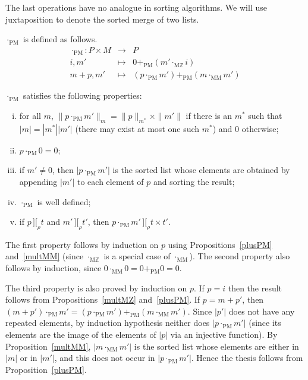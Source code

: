\documentclass[numreferences]{kluwer}
\newcommand{\intII}{\,]\![}
\newcommand{\intrel}{\mathbin{\intII_{\rho}}}
\newcommand{\Z}{{\mathbb Z}}
\newcommand{\coeff}[2]{\ensuremath{\|#2\|_{#1}}}
\newcommand{\multMZ}{\ensuremath{\cdot_{\mathrm M\Z}}}
\newcommand{\multMM}{\ensuremath{\cdot_{\mathrm{MM}}}}
\newcommand{\plusPM}{\ensuremath{+_{\mathrm{PM}}}}
\newcommand{\multPM}{\ensuremath{\cdot_{\mathrm{PM}}}}
\begin{document}
\begin{article}
The last operations have no analogue in sorting algorithms.
We will use juxtaposition to denote the sorted merge of two lists.

\begin{definition}\label{defn:multPM} {\multPM} is defined as follows.
\begin{eqnarray*}
\multPM : P\times M & \to & P \\
 i, m' & \mapsto & 0\plusPM (m'\multMZ i) \\
 m+p, m' & \mapsto & (p\multPM m')\plusPM (m\multMM m')
\end{eqnarray*}
\end{definition}

\begin{proposition}\label{multPM}
{\multPM} satisfies the following properties:
\begin{enumerate}[(i)]
\item for all $m$, $\coeff m{p\multPM m'}=\coeff{m^\ast}p\times\|m'\|$ if
there is
an $m^\ast$ such that $|m|=|m^\ast||m'|$ (there may exist at most one such $m^\ast$) and $0$ otherwise;
\item $p\multPM 0=0$;
\item if $m'\neq 0$, then $|p\multPM m'|$ is the sorted list whose
elements are obtained by appending $|m'|$ to each element of $p$ and
sorting the result;
\item {\multPM} is well defined;
\item if $p\intrel t$ and $m'\intrel t'$, then $p\multPM m'\intrel t\times t'$.
\end{enumerate}
\end{proposition}
\begin{pf}
The first property follows by induction on $p$ using
Propositions~\ref{plusPM} and~\ref{multMM} (since {\multMZ} is
a special case of {\multMM}).  The second property also follows
by induction, since $0\multMM0=0\plusPM 0=0$.

The third property is also proved by induction on $p$.  If $p=i$
then the result follows from Propositions~\ref{multMZ} and~\ref{plusPM}.
If $p=m+p'$, then $(m+p')\multPM m'=(p\multPM m')\plusPM (m\multMM m')$.
Since $|p'|$ does not have any repeated elements, by induction hypothesis
neither does $|p\multPM m'|$ (since its elements are the image of the
elements of $|p|$ via an injective function).  By Proposition~\ref{multMM},
$|m\multMM m'|$ is the sorted list whose elements are either in $|m|$ or in
$|m'|$, and this does not occur in $|p\multPM m'|$.  Hence the thesis
follows from Proposition~\ref{plusPM}.


\end{pf}
\end{article}
\end{document}
